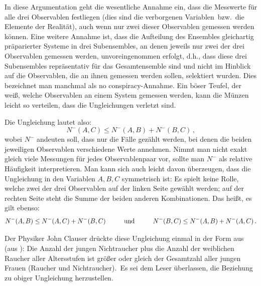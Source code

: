 In diese Argumentation geht die wesentliche Annahme
ein, dass die Messwerte f\"ur alle drei Observablen
festliegen (dies sind die \glqq verborgenen Variablen\grqq\ bzw.\
die \glqq Elemente der Realit\"at\grqq), auch wenn nur zwei
dieser Observablen gemessen werden k\"onnen. Eine weitere
Annahme ist, dass die Aufteilung des Ensembles gleichartig
pr\"aparierter Systeme in drei Subensembles, an denen jeweils
nur zwei der drei Observablen gemessen werden, unvoreingenommen
erfolgt, d.h., dass diese drei Subensembles repr\"asentativ f\"ur das
Gesamtensemble sind und nicht im Hinblick auf die Observablen,
die an ihnen gemessen werden sollen, selektiert wurden. Dies
bezeichnet man manchmal als \glqq no conspiracy\grqq-Annahme.
Ein \glqq b\"oser Teufel\grqq, der wei\ss, welche Observablen an
einem System gemessen werden, kann die M\"unzen leicht so
verteilen, dass die Ungleichungen verletzt sind. 

Die Ungleichung lautet also:
\begin{equation}
\label{eq_BU1}
        N^-(A,C) \leq N^-(A,B) + N^-(B,C)  \, ,
\end{equation}
wobei $N^-$ andeuten soll, dass nur die F\"alle
gez\"ahlt werden, bei denen die beiden jeweiligen
Observablen verschiedene Werte annehmen. Nimmt man nicht
exakt gleich viele Messungen f\"ur jedes Observablenpaar vor,
sollte man $N^-$ als relative H\"aufigkeit interpretieren. Man
kann sich auch leicht davon \"uberzeugen, dass die Ungleichung
in den Variablen $A, B, C$ symmetrisch ist: Es spielt keine
Rolle, welche zwei der drei Observablen auf der linken Seite
gew\"ahlt werden; auf der rechten Seite steht die Summe der
beiden anderen Kombinationen. Das hei\ss t, es gilt ebenso: 
\begin{equation}
        N^-(A,B) \leq N^-(A,C) + N^-(B,C)   \hspace{1cm} {\rm und} \hspace{1cm}
        N^-(B,C) \leq N^-(A,B) + N^-(A,C) \, .  
\end{equation}


Der Physiker John Clauser 
dr\"uckte diese Ungleichung einmal in der Form aus 
(aus \cite{Gilder}): \glqq Die Anzahl der jungen
Nichtraucher plus die Anzahl der weiblichen Raucher
aller Altersstufen ist gr\"o\ss er oder gleich der
Gesamtzahl aller jungen Frauen (Raucher und
Nichtraucher).\grqq\ Es sei dem Leser \"uberlassen,
die Beziehung zu obiger Ungleichung herzustellen.

